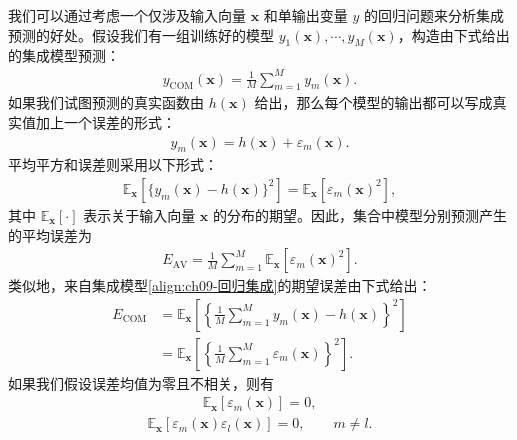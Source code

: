 \documentclass[../../main.tex]{subfiles}
\begin{document}
我们可以通过考虑一个仅涉及输入向量 $\boldsymbol{x}$ 和单输出变量 $y$ 的回归问题来分析集成预测的好处。假设我们有一组训练好的模型 $y_{1}(\boldsymbol{x}),\cdots,y_{M}(\boldsymbol{x})$，构造由下式给出的集成模型预测：
\begin{align}
y_{\mathrm{COM}}(\boldsymbol{x})=\frac{1}{M}\sum_{m=1}^{M}y_{m}(\boldsymbol{x}).
\label{align:ch09-回归集成}
\end{align}
如果我们试图预测的真实函数由 $h(\boldsymbol{x})$ 给出，那么每个模型的输出都可以写成真实值加上一个误差的形式：
\begin{align}
y_{m}(\boldsymbol{x})=h(\boldsymbol{x})+\varepsilon_{m}(\boldsymbol{x}).
\label{align:ch09-模型误差}
\end{align}
平均平方和误差则采用以下形式：
\begin{align}
\mathbb{E}_{\boldsymbol{x}}\!\left[\{y_{m}(\boldsymbol{x})-h(\boldsymbol{x})\}^{2}\right]=\mathbb{E}_{\boldsymbol{x}}[\varepsilon_{m}(\boldsymbol{x})^{2}],
\label{align:ch09-平方误差}
\end{align}
其中 $\mathbb{E}_{\boldsymbol{x}}[\cdot]$ 表示关于输入向量 $\boldsymbol{x}$ 的分布的期望。因此，集合中模型分别预测产生的平均误差为
\begin{align}
E_{\mathrm{AV}}=\frac{1}{M}\sum_{m=1}^{M}\mathbb{E}_{\boldsymbol{x}}[\varepsilon_{m}(\boldsymbol{x})^{2}].
\label{align:ch09-平均误差}
\end{align}
类似地，来自集成模型\eqref{align:ch09-回归集成}的期望误差由下式给出：
\begin{align}
E_{\mathrm{COM}}&=\mathbb{E}_{\boldsymbol{x}}\!\left[\left\{\frac{1}{M}\sum_{m=1}^{M}y_{m}(\boldsymbol{x})-h(\boldsymbol{x})\right\}^{2}\right]\nonumber\\
&=\mathbb{E}_{\boldsymbol{x}}\!\left[\left\{\frac{1}{M}\sum_{m=1}^{M}\varepsilon_{m}(\boldsymbol{x})\right\}^{2}\right].
\label{align:ch09-集成误差}
\end{align}
如果我们假设误差均值为零且不相关，则有
\begin{align}
\mathbb{E}_{\boldsymbol{x}}[\varepsilon_{m}(\boldsymbol{x})]=0,
\label{align:ch09-零均值}
\end{align}
\begin{align}
\mathbb{E}_{\boldsymbol{x}}[\varepsilon_{m}(\boldsymbol{x})\varepsilon_{l}(\boldsymbol{x})]=0,\qquad m\neq l.
\label{align:ch09-不相关}
\end{align}
\end{document}
